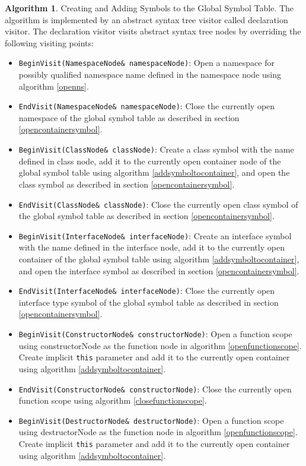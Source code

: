 \documentclass[a4paper,oneside,11pt]{book}
\theoremstyle{definition}
\newtheorem{algo}{Algorithm}[section]
\begin{document}
\begin{algo} Creating and Adding Symbols to the Global Symbol Table.
The algorithm is implemented by an abstract syntax tree visitor called declaration visitor.
The declaration visitor visits abstract syntax tree nodes by overriding the following visiting points:
\begin{itemize}
\item
\verb|BeginVisit(NamespaceNode& namespaceNode)|:
Open a namespace for possibly qualified namespace name defined in the namespace node using algorithm \ref{openns}.
\item
\verb|EndVisit(NamespaceNode& namespaceNode)|:
Close the currently open namespace of the global symbol table as described in section \ref{opencontainersymbol}.
\item
\verb|BeginVisit(ClassNode& classNode)|:
Create a class symbol with the name defined in class node,
add it to the currently open container node of the global symbol table using algorithm \ref{addsymboltocontainer},
and open the class symbol as described in section \ref{opencontainersymbol}.
\item
\verb|EndVisit(ClassNode& classNode)|:
Close the currently open class symbol of the global symbol table as described in section \ref{opencontainersymbol}.
\item
\verb|BeginVisit(InterfaceNode& interfaceNode)|:
Create an interface symbol with the name defined in the interface node,
add it to the currently open container of the global symbol table using algorithm \ref{addsymboltocontainer},
and open the interface symbol as described in section \ref{opencontainersymbol}.
\item
\verb|EndVisit(InterfaceNode& interfaceNode)|:
Close the currently open interface type symbol of the global symbol table as described in section \ref{opencontainersymbol}.
\item
\verb|BeginVisit(ConstructorNode& constructorNode)|:
Open a function scope using constructorNode as the function node in algorithm \ref{openfunctionscope}.
Create implicit \verb|this| parameter and add it to the currently open container using algorithm \ref{addsymboltocontainer}.
\item
\verb|EndVisit(ConstructorNode& constructorNode)|:
Close the currently open function scope using algorithm \ref{closefunctionscope}.
\item
\verb|BeginVisit(DestructorNode& destructorNode)|:
Open a function scope using destructorNode as the function node in algorithm \ref{openfunctionscope}.
Create implicit \verb|this| parameter and add it to the currently open container using algorithm \ref{addsymboltocontainer}.

\end{itemize}
\end{algo}
\end{document}
